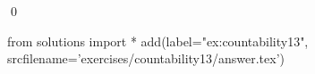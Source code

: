 
\begin{ex} 
  \label{ex:countability13}
  
  \qed
\end{ex} 
\begin{python0}
from solutions import *
add(label="ex:countability13",
    srcfilename='exercises/countability13/answer.tex') 
\end{python0}
